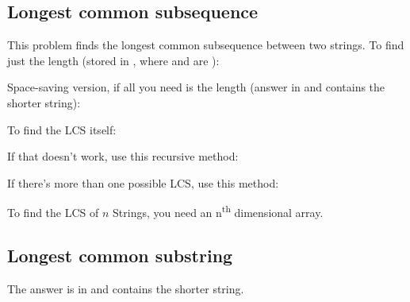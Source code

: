 
\subsection*{Longest common subsequence}

This problem finds the longest common subsequence between two strings. To find just the length (stored in , where  and  are ):



Space-saving version, if all you need is the length (answer in  and  contains the shorter string):



To find the LCS itself:



If that doesn't work, use this recursive method:



If there’s more than one possible LCS, use this method:



To find the LCS of $n$ Strings, you need an n\textsuperscript{th} dimensional array.

\subsection*{Longest common substring}

The answer is in  and  contains the shorter string.



\newpage